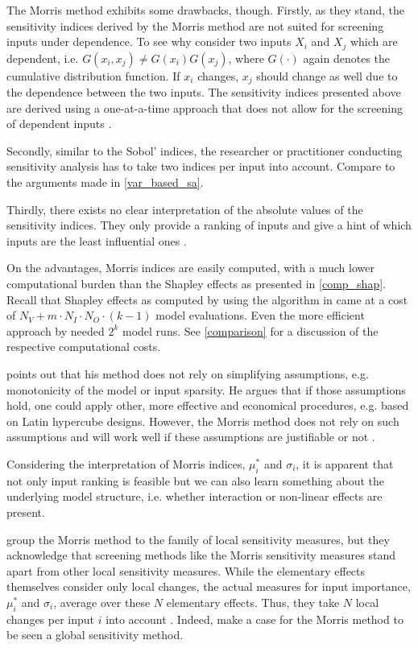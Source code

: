 The Morris method exhibits some drawbacks, though. Firstly, as they stand, the sensitivity indices derived by the Morris method are not suited for screening inputs under dependence. To see why consider two inputs $X_i$ and $X_j$ which are dependent, i.e. $G(x_i, x_j) \neq G(x_i)G(x_j)$, where $G(\cdot)$ again denotes the cumulative distribution function. If $x_i$ changes, $x_j$ should change as well due to the dependence between the two inputs. The sensitivity indices presented above are derived using a one-at-a-time approach that does not allow for the screening of dependent inputs \citep{GM17}.

Secondly, similar to the Sobol' indices, the researcher or practitioner conducting sensitivity analysis has to take two indices per input into account. Compare to the arguments made in \cref{var_based_sa}.

Thirdly, there exists no clear interpretation of the absolute values of the sensitivity indices. They only provide a ranking of inputs and give a hint of which inputs are the least influential ones \citep{GM17}.

On the advantages, Morris indices are easily computed, with a much lower computational burden than the Shapley effects as presented in \cref{comp_shap}. Recall that Shapley effects as computed by using the algorithm in \citet{SNS16} came at a cost of $N_V+m \cdot N_I \cdot N_O \cdot (k-1)$ model evaluations. Even the more efficient approach by \citet{PRB20} needed $2^k$ model runs. See \cref{comparison} for a discussion of the respective computational costs.

\citet{M91} points out that his method does not rely on simplifying assumptions, e.g. monotonicity of the model or input sparsity. He argues that if those assumptions hold, one could apply other, more effective and economical procedures, e.g. based on Latin hypercube designs. However, the Morris method does not rely on such assumptions and will work well if these assumptions are justifiable or not \citep{M91}.

Considering the interpretation of Morris indices, $\mu_i^\ast$ and $\sigma_i$, it is apparent that not only input ranking is feasible but we can also learn something about the underlying model structure, i.e. whether interaction or non-linear effects are present.

\citet{BP16} group the Morris method to the family of local sensitivity measures, but they acknowledge that screening methods like the Morris sensitivity measures stand apart from other local sensitivity measures. While the elementary effects themselves consider only local changes, the actual measures for input importance, $\mu_i^\ast$ and $\sigma_i$, average over these $N$ elementary effects. Thus, they take $N$ local changes per input $i$ into account \citep{M91}. Indeed, \citet{CCS11} make a case for the Morris method to be seen a global sensitivity method.

